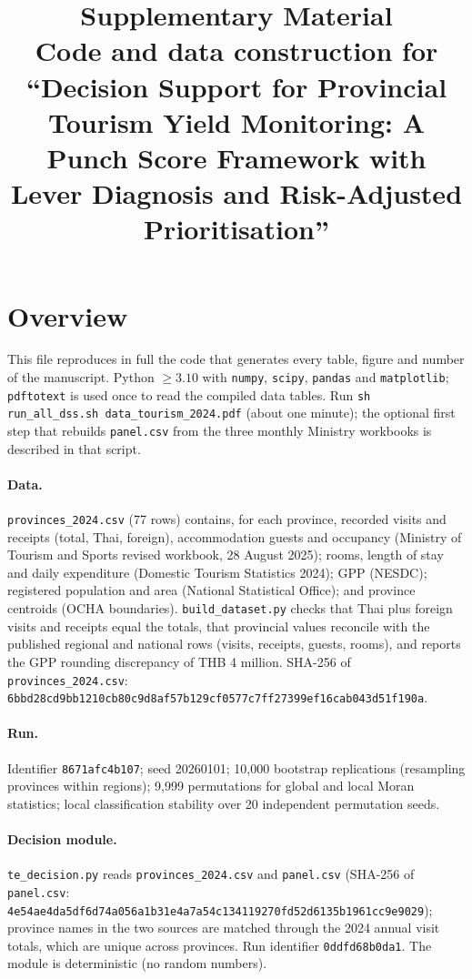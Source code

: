 \documentclass[10pt,a4paper]{article}
\title{Supplementary Material\\ \large Code and data construction for ``Decision Support for Provincial Tourism Yield Monitoring: A Punch Score Framework with Lever Diagnosis and Risk-Adjusted Prioritisation''}
\date{}
\begin{document}
\maketitle
\section{Overview}
This file reproduces in full the code that generates every table, figure and number of the manuscript. Python $\ge3.10$ with \texttt{numpy}, \texttt{scipy}, \texttt{pandas} and \texttt{matplotlib}; \texttt{pdftotext} is used once to read the compiled data tables. Run \texttt{sh run\_all\_dss.sh data\_tourism\_2024.pdf} (about one minute); the optional first step that rebuilds \texttt{panel.csv} from the three monthly Ministry workbooks is described in that script.

\paragraph{Data.} \texttt{provinces\_2024.csv} (77 rows) contains, for each province, recorded visits and receipts (total, Thai, foreign), accommodation guests and occupancy (Ministry of Tourism and Sports revised workbook, 28 August 2025); rooms, length of stay and daily expenditure (Domestic Tourism Statistics 2024); GPP (NESDC); registered population and area (National Statistical Office); and province centroids (OCHA boundaries). \texttt{build\_dataset.py} checks that Thai plus foreign visits and receipts equal the totals, that provincial values reconcile with the published regional and national rows (visits, receipts, guests, rooms), and reports the GPP rounding discrepancy of THB 4 million. SHA-256 of \texttt{provinces\_2024.csv}: \texttt{6bbd28cd9bb1210cb80c9d8af57b129cf0577c7ff27399ef16cab043d51f190a}.

\paragraph{Run.} Identifier \texttt{8671afc4b107}; seed 20260101; 10{,}000 bootstrap replications (resampling provinces within regions); 9{,}999 permutations for global and local Moran statistics; local classification stability over 20 independent permutation seeds.

\paragraph{Decision module.} \texttt{te\_decision.py} reads \texttt{provinces\_2024.csv} and \texttt{panel.csv} (SHA-256 of \texttt{panel.csv}: \texttt{4e54ae4da5df6d74a056a1b31e4a7a54c134119270fd52d6135b1961cc9e9029}); province names in the two sources are matched through the 2024 annual visit totals, which are unique across provinces. Run identifier \texttt{0ddfd68b0da1}. The module is deterministic (no random numbers).
\end{document}
